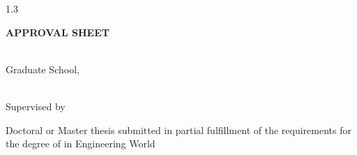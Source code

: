 \newpage 
\cleardoublepage  %

\frontmatterpagenumbers %
  
\thispagestyle{empty}  %


\begin{spacing}{1.3}    %
  \begin{center}
    {\bfseries APPROVAL SHEET\\[1\baselineskip]} %
    {\LARGE\bfseries \thesistitleEn\par}    
    {\large	\department\\ Graduate School, \university\par}
    
    \vspace{1cm}
    
    {\Large {\bfseries \thesisauthor }\\[1\baselineskip]} 
    Supervised by \supervisorEn\par
    
    \vspace{1cm}
    
    {Doctoral or Master thesis submitted in partial fulfillment of the requirements for the degree of \textbf{\degree} in Engineering World\par}
  \end{center}
  \vspace{1cm}




\end{spacing}
